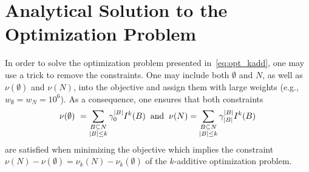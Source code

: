 \section{Analytical Solution to the Optimization Problem} \label{app:solution}

In order to solve the optimization problem presented in~\cref{eq:opt_kadd}, one may use a trick to remove the constraints.
One may include both $\emptyset$ and $N$, as well as $\nu(\emptyset)$ and $\nu(N)$, into the objective and assign them with large weights (e.g., $w_{\emptyset}=w_{N}=10^6$).
As a consequence, one ensures that both constraints
\begin{equation*}
    \nu(\emptyset) \ = \sum\limits_{\substack{B \subseteq N \\ |B| \leq k}} \gamma^{\left|B \right|}_0 I^k(B) \hspace{0.2cm} \text{and} \hspace{0.2cm} \nu(N) = \sum\limits_{\substack{B \subseteq N \\ |B| \leq k}} \gamma^{\left|B \right|}_{\left| B \right|} I^k(B)
\end{equation*}
 are satisfied when minimizing the objective which implies the constraint $\nu(N) - \nu(\emptyset) = \nu_k(N) - \nu_k(\emptyset)$ of the $k$-additive optimization problem.

